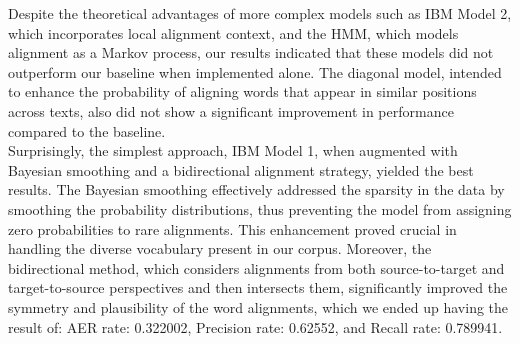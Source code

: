 \documentclass{article}
\begin{document}
\noindent Despite the theoretical advantages of more complex models such as IBM Model 2, which incorporates local alignment context, and the HMM, which models alignment as a Markov process, our results indicated that these models did not outperform our baseline when implemented alone. The diagonal model, intended to enhance the probability of aligning words that appear in similar positions across texts, also did not show a significant improvement in performance compared to the baseline.\\

\noindent Surprisingly, the simplest approach, IBM Model 1, when augmented with Bayesian smoothing and a bidirectional alignment strategy, yielded the best results. The Bayesian smoothing effectively addressed the sparsity in the data by smoothing the probability distributions, thus preventing the model from assigning zero probabilities to rare alignments. This enhancement proved crucial in handling the diverse vocabulary present in our corpus. Moreover, the bidirectional method, which considers alignments from both source-to-target and target-to-source perspectives and then intersects them, significantly improved the symmetry and plausibility of the word alignments, which we ended up having the result of:
AER rate: 0.322002, Precision rate: 0.62552, and Recall rate: 0.789941.
\end{document}
